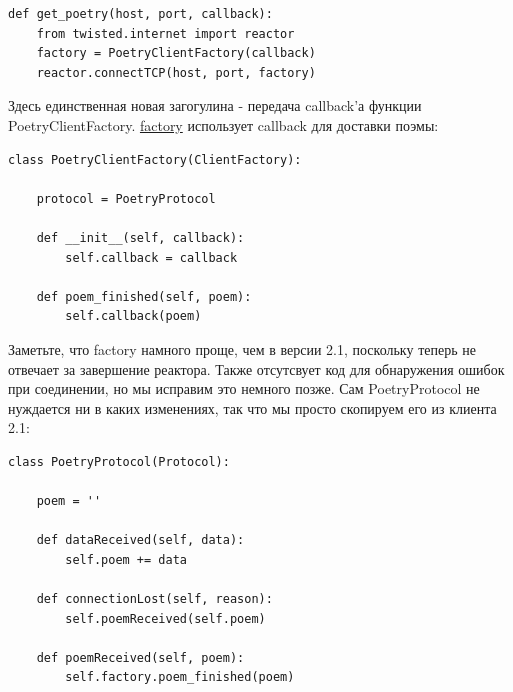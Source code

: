 \begin{scriptsize}\begin{verbatim}
def get_poetry(host, port, callback):
    from twisted.internet import reactor
    factory = PoetryClientFactory(callback)
    reactor.connectTCP(host, port, factory)
\end{verbatim}\end{scriptsize}


Здесь единственная новая загогулина - передача callback'а  
функции PoetryClientFactory. 
\href{http://github.com/jdavisp3/twisted-intro/blob/master/twisted-client-3/get-poetry.py#L66}{factory} 
использует callback для доставки поэмы:

\begin{scriptsize}\begin{verbatim}
class PoetryClientFactory(ClientFactory):

    protocol = PoetryProtocol

    def __init__(self, callback):
        self.callback = callback

    def poem_finished(self, poem):
        self.callback(poem)
\end{verbatim}\end{scriptsize}


Заметьте, что factory намного проще, чем в версии 2.1, 
поскольку теперь не отвечает за завершение реактора. 
Также отсутсвует код для обнаружения ошибок при соединении, 
но мы исправим это немного позже. Сам PoetryProtocol 
не нуждается ни в каких изменениях, так что мы просто 
скопируем его из клиента 2.1: 

\begin{scriptsize}\begin{verbatim}
class PoetryProtocol(Protocol):

    poem = ''

    def dataReceived(self, data):
        self.poem += data

    def connectionLost(self, reason):
        self.poemReceived(self.poem)

    def poemReceived(self, poem):
        self.factory.poem_finished(poem)
\end{verbatim}\end{scriptsize}

